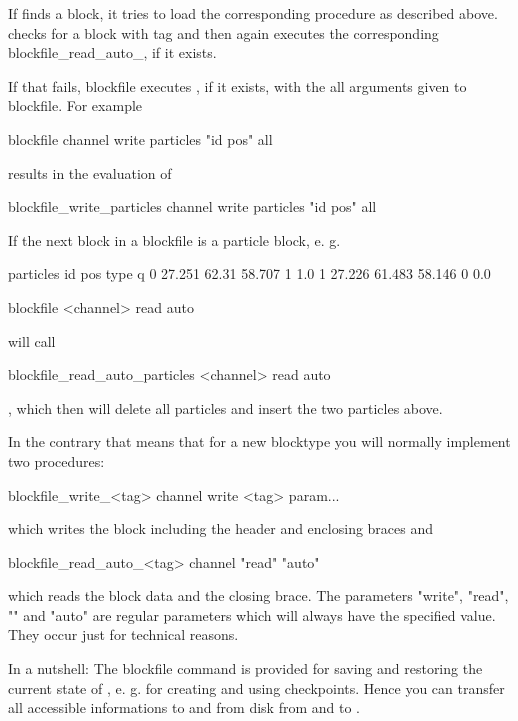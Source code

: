 If  finds a block, it tries to
load the corresponding procedure as described above.
 checks for a block with tag
 and then again executes the corresponding
blockfile\_read\_auto\_, if it exists.

If that fails, blockfile executes , if
it exists, with the all arguments given to blockfile. For example
\begin{code}
blockfile channel write particles "id pos" all 
\end{code}
results in the evaluation of
\begin{code}
blockfile\_write\_particles channel write particles "id pos" all 
\end{code}
If the next block in a blockfile is a particle block, e. g.
\begin{tclcode}
{particles {id pos type q}
           {0 27.251 62.31 58.707 1 1.0}
           {1 27.226 61.483 58.146 0 0.0}
}
\end{tclcode}	
\begin{code}
  blockfile <channel> read auto
\end{code}
will call
\begin{code}
blockfile_read_auto_particles <channel> read auto
\end{code}
, which then will delete all particles and insert the two particles
above.

In the contrary that means that for a new blocktype you will normally
implement two procedures:
\begin{tclcode}
blockfile_write_<tag> {channel write <tag> param...}
\end{tclcode}
which writes the block including the header and enclosing braces and
\begin{tclcode}
blockfile_read_auto_<tag> {channel "read" "auto"}
\end{tclcode}
which reads the block data and the closing brace. The parameters
"write", "read", "" and "auto" are regular parameters which
will always have the specified value. They occur just for technical
reasons.




In a nutshell: The blockfile command is provided for saving and
restoring the current state of \es, e. g. for creating and using
checkpoints. Hence you can transfer all accessible informations to and
from disk from and to \es.

